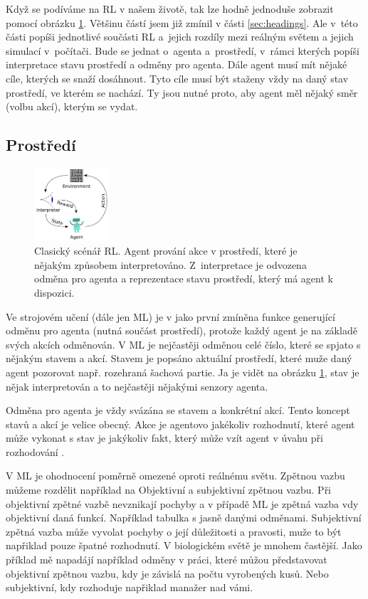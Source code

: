 \documentclass{article}
\begin{document}
Když se podíváme na RL v našem životě, tak lze hodně jednoduše zobrazit pomocí obrázku \ref{zavislostKnnRec}. Většinu částí jsem již zmínil v části \ref{sec:headings}. Ale v~této části popíši jednotlivé součásti RL a~jejich rozdíly mezi reálným světem a jejich simulací v~počítači. Bude se jednat o~agenta a~prostředí, v~rámci kterých popíši interpretace stavu prostředí a odměny pro agenta.
Dále agent musí mít nějaké cíle, kterých se snaží dosáhnout. Tyto cíle musí být staženy vždy na daný stav prostředí, ve kterém se nachází. Ty jsou nutné proto, aby agent měl nějaký směr (volbu akcí), kterým se vydat. 

\subsection{Prostředí}

\begin{figure}\centering
	\includegraphics[width=0.25\textwidth]{img/RLdiagram}
 	\caption[]{Clasický scénář RL. Agent prování akce v prostředí, které je nějakým způsobem interpretováno. Z~interpretace je odvozena odměna pro agenta a reprezentace stavu prostředí, který má agent k dispozici. \cite{pict} }\label{zavislostKnnRec}
 \end{figure}	


Ve strojovém učení (dále jen ML) je v \cite{sutton1999reinforcement} jako první zmíněna funkce generující odměnu pro agenta (nutná součást prostředí), protože každý agent je na základě svých akcích odměnován. V ML je nejčastěji odměnou celé číslo, které se spjato s nějakým stavem a akcí. Stavem je popsáno aktuální prostředí, které muže daný agent pozorovat např. rozehraná šachová partie. Ja je vidět na obrázku \ref{zavislostKnnRec}, stav je nějak interpretován a to nejčastěji nějakými senzory agenta.
 

Odměna pro agenta je vždy svázána se stavem a konkrétní akcí. Tento koncept stavů a akcí je velice obecný. Akce je  agentovo jakékoliv rozhodnutí, které agent může vykonat s stav je jakýkoliv fakt, který může vzít agent v úvahu při rozhodování \cite{sutton1999reinforcement}. 

V ML je ohodnocení poměrně omezené oproti reálnému světu. Zpětnou vazbu můžeme rozdělit například na Objektivní a subjektivní zpětnou vazbu. Při objektivní zpětné vazbě nevznikají pochyby a v případě ML je zpětná vazba vdy objektivní daná funkcí. Například tabulka s jasně danými odměnami. Subjektivní zpětná vazba může vyvolat pochyby o její důležitosti a pravosti, muže to být napřiklad pouze špatné rozhodnutí. V biologickém světě je mnohem častější. Jako příklad mě napadájí například odměny v práci, které můžou představovat objektivní zpětnou vazbu, kdy je závislá na počtu vyrobených kusů. Nebo subjektivní, kdy rozhoduje napřiklad manažer nad vámi.
\end{document}
